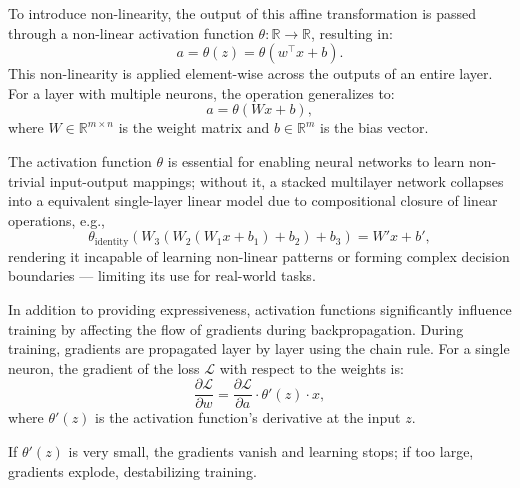 \documentclass{article}
\begin{document}
\vspace{4pt}

\noindent
To introduce non-linearity, the output of this affine transformation is passed through a non-linear activation function \( \theta : \mathbb{R} \to \mathbb{R} \), resulting in:
\[
a = \theta(z) = \theta(w^\top x + b).
\]
This non-linearity is applied element-wise across the outputs of an entire layer. For a layer with multiple neurons, the operation generalizes to:
\[
a = \theta(Wx + b),
\]
where \( W \in \mathbb{R}^{m \times n} \) is the weight matrix and \( b \in \mathbb{R}^m \) is the bias vector.

\vspace{4pt}

\noindent
The activation function \( \theta \) is essential for enabling neural networks to learn non-trivial input-output mappings; without it, a stacked multilayer network collapses into a equivalent single-layer linear model due to compositional closure of linear operations, e.g.,
\[
\theta_{\text{identity}}(W_3(W_2(W_1x + b_1) + b_2) + b_3) = W'x + b',
\]
rendering it incapable of learning non-linear patterns or forming complex decision boundaries --- limiting its use for real-world tasks.



\vspace{4pt}

\noindent
In addition to providing expressiveness, activation functions significantly influence training by affecting the flow of gradients during backpropagation. During training, gradients are propagated layer by layer using the chain rule. For a single neuron, the gradient of the loss \( \mathcal{L} \) with respect to the weights is:
\[
\frac{\partial \mathcal{L}}{\partial w} = \frac{\partial \mathcal{L}}{\partial a} \cdot \theta'(z) \cdot x,
\]
where \( \theta'(z) \) is the activation function's derivative at the input \(z\). 

\vspace{4pt}

\noindent
If \( \theta'(z) \) is very small, the gradients vanish and learning stops; if too large, gradients explode, destabilizing training. 






\end{document}
